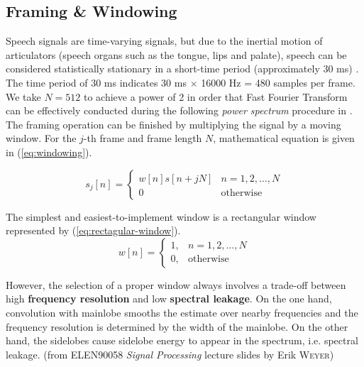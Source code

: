 
\subsection{Framing \& Windowing}

Speech signals are time-varying signals, but due to the inertial motion of articulators (speech organs such as the tongue, lips and palate), speech can be considered statistically stationary in a short-time period (approximately 30 ms) \cite{brandstein1995practical}. The time period of 30 ms indicates 30 ms $\times$ 16000 Hz = 480 samples per frame. We take $N = 512$ to achieve a power of 2 in order that Fast Fourier Transform can be effectively conducted during the following \textit{power spectrum} procedure in .\\

The framing operation can be finished by multiplying the signal by a moving window. For the $j$-th frame and frame length $N$, mathematical equation is given in (\ref{eq:windowing}).

\begin{equation}
\label{eq:windowing}
s_j[n] =
\begin{cases}
w[n] s[n+jN] & n = 1, 2, \dots, N\\
0 & \text{otherwise}
\end{cases}
\end{equation}

The simplest and easiest-to-implement window is a rectangular window represented by (\ref{eq:rectagular-window}).
\begin{equation}
\label{eq:rectagular-window}
w[n] =
\begin{cases}
1, & n = 1, 2, \dots, N\\
0, & \text{otherwise}
\end{cases}
\end{equation}

However, the selection of a proper window always involves a trade-off between high \textbf{frequency resolution} and low \textbf{spectral leakage}. On the one hand, convolution with mainlobe smooths the estimate over nearby frequencies and the frequency resolution is determined by the width of the mainlobe. On the other hand, the sidelobes cause sidelobe energy to appear in the spectrum, i.e. spectral leakage. (from ELEN90058 \textit{Signal Processing} lecture slides by Erik \textsc{Weyer})

